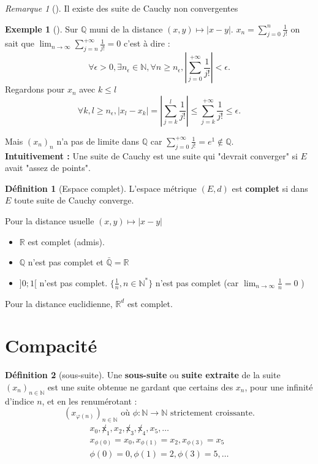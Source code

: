 \documentclass{article}
\theoremstyle{plain}%
\theoremstyle{definition}
\newtheorem{defn}{Définition}[section]
\newtheorem{exmp}{Exemple}[section]
\theoremstyle{remark}
\newtheorem*{rem}{Remarque}
\begin{document}
\begin{rem}[]
    Il existe des suite de Cauchy non convergentes
    
    \begin{exmp}[]
        Sur $ \mathbb{Q} $ muni de la distance $ (x,y) \mapsto \left| x-y \right|  $. $ x_n = \sum_{j=0}^{n}\frac{1}{j!} $ on sait que $ \lim_{n \to \infty} \sum_{j=n}^{+\infty }\frac{1}{j!} = 0 $ c'est à dire : 
        \[
        \forall \epsilon > 0, \exists n_\epsilon \in \mathbb{N}, \forall n \geq n_\epsilon, \left| \sum_{j=0}^{+\infty }\frac{1}{j!} \right| < \epsilon 
        .\]
    Regardons pour $ x_n $ avec $ k \leq l $ 
    \[
        \forall k,l \geq n_\epsilon, \left| x_l - x_k \right| = \left| \sum_{j=k}^{l} \frac{1}{j!}\right| \leq \sum_{j=k}^{+\infty } \frac{1}{j!} \leq \epsilon 
        .\]
    \end{exmp}
    Mais $ (x_n)_n $ n'a pas de limite dans $ \mathbb{Q} $ car $ \sum_{j=0}^{+\infty }\frac{1}{j!} = e^1 \not\in  \mathbb{Q}$. \\
    \textbf{Intuitivement :} Une suite de Cauchy est une suite qui "devrait converger" si $ E $ avait "assez de points". 
\end{rem}

\begin{defn}[Espace complet]
    L'espace métrique $ (E,d) $ est \textbf{complet} si dans $ E $ toute suite de Cauchy converge.
    
    Pour la distance usuelle $ (x,y) \mapsto \left| x-y \right| $ \begin{itemize}
        \item $ \mathbb{R} $ est complet (admis).
        \item $ \mathbb{Q} $ n'est pas complet et $ \bar{\mathbb{Q}} = \mathbb{R} $ 
        \item $ ]0;1[ $ n'est pas complet. $ \{\frac{1}{n}, n \in \mathbb{N}^*\} $ n'est pas complet (car $ \lim_{n \to \infty} \frac{1}{n} = 0 $ ) 
    \end{itemize}
    Pour la distance euclidienne, $ \mathbb{R}^d $ est complet.
\end{defn}

\section{Compacité}

\begin{defn}[sous-suite]
    Une \textbf{sous-suite} ou \textbf{suite extraite} de la suite $ (x_n)_{n \in \mathbb{N}} $ est une suite obtenue ne gardant que certains des $ x_n $, pour une infinité d'indice $ n $, et en les renumérotant : 
    \[
        (x_{\varphi (n)})_{n \in \mathbb{N}} \text{ où } \phi : \mathbb{N} \to \mathbb{N} \text{ strictement croissante}
    .\]
    \begin{align*}
        x_0, \not x_1, x_2, \not x_3, \not x_4, x_5, \dots \\
        x_{\phi (0)} = x_0, x_{\phi (1)} = x_2, x_{\phi (3)} = x_5 \\
        \phi (0) = 0, \phi (1) = 2, \phi (3)=5, \dots
    \end{align*}
\end{defn}
\end{document}
